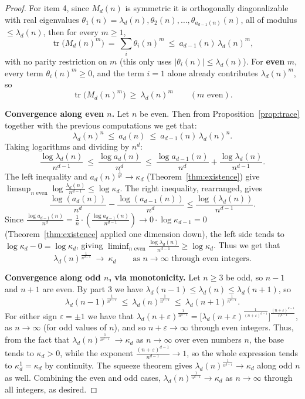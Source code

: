 \documentclass{article}
\theoremstyle{plain}
\theoremstyle{definition}
\theoremstyle{remark}
\DeclareMathOperator{\tr}{tr}
\begin{document}
\begin{proof}
For item 4, since $M_d(n)$ is symmetric it is orthogonally diagonalizable with real eigenvalues $\theta_1(n)=\lambda_d(n),\theta_2(n),\dots,\theta_{a_{d-1}(n)}(n)$, all of modulus $\le\lambda_d(n)$, then for every $m\ge1$,
\begin{equation}\label{eq:traceupper}
\tr\big(M_d(n)^m\big)\ =\ \sum_i\theta_i(n)^m\ \le\ a_{d-1}(n)\,\lambda_d(n)^m,
\end{equation}
with no parity restriction on $m$ (this only uses $|\theta_i(n)|\le\lambda_d(n)$). For \textbf{even} $m$, every term $\theta_i(n)^m\ge0$, and the term $i=1$ alone already contributes $\lambda_d(n)^m$, so
\begin{equation}\label{eq:tracelower}
\tr\big(M_d(n)^m\big)\ \ge\ \lambda_d(n)^m\qquad(m\text{ even}).
\end{equation}

\textbf{Convergence along even $n$.} Let $n$ be even. Then from  Proposition~\ref{prop:trace} together with the previous computations we get that:
\[
\lambda_d(n)^n\ \le\ a_d(n)\ \le\ a_{d-1}(n)\,\lambda_d(n)^n.
\]
Taking logarithms and dividing by $n^d$:
\[
\frac{\log\lambda_d(n)}{n^{d-1}}\ \le\ \frac{\log a_d(n)}{n^d}\ \le\ \frac{\log a_{d-1}(n)}{n^d}+\frac{\log\lambda_d(n)}{n^{d-1}}.
\]
The left inequality and $a_d(n)^{\frac{1}{n^d}}\to\kappa_d$ (Theorem~\ref{thm:existence}) give $\limsup_{n\text{ even}}\log\frac{\lambda_d(n)}{n^{d-1}}\le\log\kappa_d$. The right inequality, rearranged, gives $$\frac{\log (a_d(n))}{n^d}-\frac{\log (a_{d-1}(n))}{n^d}\le\frac{\log(\lambda_d(n))}{n^{d-1}}.$$ Since $\frac{\log a_{d-1}(n)}{n^d}=\tfrac1n\cdot(\frac{\log a_{d-1}(n)}{n^{d-1}})\to0\cdot\log\kappa_{d-1}=0$ (Theorem~\ref{thm:existence} applied one dimension down), the left side tends to $\log\kappa_d-0=\log\kappa_d$, giving $\liminf_{n\text{ even}}\frac{\log\lambda_d(n)}{n^{d-1}}\ge\log\kappa_d$. Thus we get that
\begin{equation*}
\lambda_d(n)^{\frac{1}{n^{d-1}}}\ \longrightarrow\ \kappa_d\qquad\text{as }n\to\infty\text{ through even integers.}
\end{equation*}

\textbf{Convergence along odd $n$, via monotonicity.} Let $n\ge3$ be odd, so $n-1$ and $n+1$ are even. By part 3 we have  $\lambda_d(n-1)\le\lambda_d(n)\le\lambda_d(n+1)$, so
\[
\lambda_d(n-1)^{\frac{1}{n^{d-1}}}\ \le\ \lambda_d(n)^{\frac{1}{n^{d-1}}}\ \le\ \lambda_d(n+1)^{\frac{1}{n^{d-1}}}.
\]
For either sign $\varepsilon=\pm1$ we have that $\lambda_d(n+\varepsilon)^{\frac{1}{n^{d-1}}}=\Big[\lambda_d(n+\varepsilon)^{\frac{1}{(n+\varepsilon)^{d-1}}}\Big]^{\frac{(n+\varepsilon)^{d-1}}{n^{d-1}}}$, as $n\to\infty$ (for odd values of $n$), and so $n+\varepsilon\to\infty$ through even integers. Thus, from the fact that $\lambda_d(n)^{\frac{1}{n^{d-1}}}\ \to \kappa_d$ as $n\to\infty$ over even numbers $n$, the base tends to $\kappa_d>0$, while the exponent $\frac{(n+\varepsilon)^{d-1}}{n^{d-1}}\to1$, so the whole expression tends to $\kappa_d^1=\kappa_d$ by continuity. The squeeze theorem gives $\lambda_d(n)^{\frac{1}{n^{d-1}}}\to\kappa_d$ along odd $n$ as well. Combining the even and odd cases, $\lambda_d(n)^{\frac{1}{n^{d-1}}}\to\kappa_d$ as $n\to\infty$ through all integers, as desired.
\end{proof}
\end{document}
